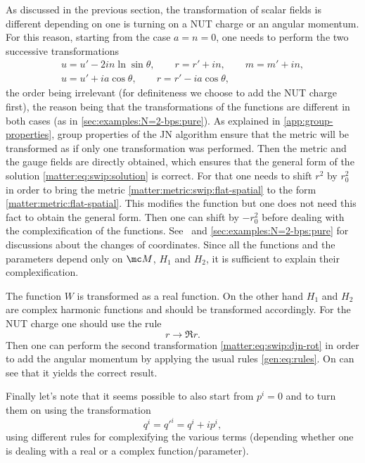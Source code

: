 As discussed in the previous section, the transformation of scalar fields is different depending on one is turning on a NUT charge or an angular momentum.
For this reason, starting from the case $a = n = 0$, one needs to perform the two successive transformations
\begin{subequations}
\begin{gather}
	\label{matter:eq:swip:djn-nut}
	u = u' - 2 i n \ln \sin \theta, \qquad
	r = r' + i n, \qquad
	m = m' + i n, \\
	\label{matter:eq:swip:djn-rot}
	u = u' + i a \cos \theta, \qquad
	r = r' - i a \cos \theta,
\end{gather}
\end{subequations}
the order being irrelevant (for definiteness we choose to add the NUT charge first), the reason being that the transformations of the functions are different in both cases (as in \cref{sec:examples:N=2-bps:pure}).
As explained in \cref{app:group-properties}, group properties of the JN algorithm ensure that the metric will be transformed as if only one transformation was performed.
Then the metric and the gauge fields are directly obtained, which ensures that the general form of the solution \eqref{matter:eq:swip:solution} is correct.
For that one needs to shift $r^2$ by $r_0^2$ in order to bring the metric \eqref{matter:metric:swip:flat-spatial} to the form \eqref{matter:metric:flat-spatial}.
This modifies the function but one does not need this fact to obtain the general form. Then one can shift by $- r_0^2$ before dealing with the complexification of the functions.
See~\cite[p.~17]{Bergshoeff:1996:StationaryAxionDilatonSolutions} and \cref{sec:examples:N=2-bps:pure} for discussions about the changes of coordinates.
Since all the functions and the parameters depend only on $\mc M$, $H_1$ and $H_2$, it is sufficient to explain their complexification.

The function $W$ is transformed as a real function.
On the other hand $H_1$ and $H_2$ are complex harmonic functions and should be transformed accordingly.
For the NUT charge one should use the rule
\begin{equation}
	r \longrightarrow \Re r.
\end{equation} 
Then one can perform the second transformation \eqref{matter:eq:swip:djn-rot} in order to add the angular momentum by applying the usual rules \eqref{gen:eq:rules}.
On can see that it yields the correct result.



Finally let's note that it seems possible to also start from $p^i = 0$ and to turn them on using the transformation
\begin{equation}
	q^i = q'^i = q^i + i p^i,
\end{equation} 
using different rules for complexifying the various terms (depending whether one is dealing with a real or a complex function/parameter).


